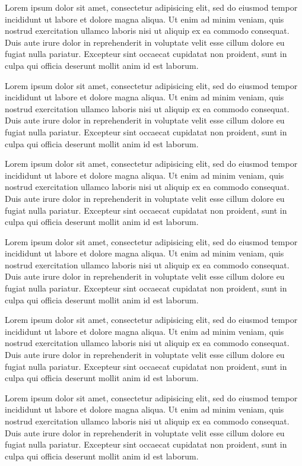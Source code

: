 Lorem ipsum dolor sit amet, consectetur adipisicing elit, sed do eiusmod tempor incididunt ut labore et dolore magna aliqua. Ut enim ad minim veniam, quis nostrud exercitation ullamco laboris nisi ut aliquip ex ea commodo consequat. Duis aute irure dolor in reprehenderit in voluptate velit esse cillum dolore eu fugiat nulla pariatur. Excepteur sint occaecat cupidatat non proident, sunt in culpa qui officia deserunt mollit anim id est laborum.

Lorem ipsum dolor sit amet, consectetur adipisicing elit, sed do eiusmod tempor incididunt ut labore et dolore magna aliqua. Ut enim ad minim veniam, quis nostrud exercitation ullamco laboris nisi ut aliquip ex ea commodo consequat. Duis aute irure dolor in reprehenderit in voluptate velit esse cillum dolore eu fugiat nulla pariatur. Excepteur sint occaecat cupidatat non proident, sunt in culpa qui officia deserunt mollit anim id est laborum.

Lorem ipsum dolor sit amet, consectetur adipisicing elit, sed do eiusmod tempor incididunt ut labore et dolore magna aliqua. Ut enim ad minim veniam, quis nostrud exercitation ullamco laboris nisi ut aliquip ex ea commodo consequat. Duis aute irure dolor in reprehenderit in voluptate velit esse cillum dolore eu fugiat nulla pariatur. Excepteur sint occaecat cupidatat non proident, sunt in culpa qui officia deserunt mollit anim id est laborum.

Lorem ipsum dolor sit amet, consectetur adipisicing elit, sed do eiusmod tempor incididunt ut labore et dolore magna aliqua. Ut enim ad minim veniam, quis nostrud exercitation ullamco laboris nisi ut aliquip ex ea commodo consequat. Duis aute irure dolor in reprehenderit in voluptate velit esse cillum dolore eu fugiat nulla pariatur. Excepteur sint occaecat cupidatat non proident, sunt in culpa qui officia deserunt mollit anim id est laborum.

Lorem ipsum dolor sit amet, consectetur adipisicing elit, sed do eiusmod tempor incididunt ut labore et dolore magna aliqua. Ut enim ad minim veniam, quis nostrud exercitation ullamco laboris nisi ut aliquip ex ea commodo consequat. Duis aute irure dolor in reprehenderit in voluptate velit esse cillum dolore eu fugiat nulla pariatur. Excepteur sint occaecat cupidatat non proident, sunt in culpa qui officia deserunt mollit anim id est laborum.

Lorem ipsum dolor sit amet, consectetur adipisicing elit, sed do eiusmod tempor incididunt ut labore et dolore magna aliqua. Ut enim ad minim veniam, quis nostrud exercitation ullamco laboris nisi ut aliquip ex ea commodo consequat. Duis aute irure dolor in reprehenderit in voluptate velit esse cillum dolore eu fugiat nulla pariatur. Excepteur sint occaecat cupidatat non proident, sunt in culpa qui officia deserunt mollit anim id est laborum.

